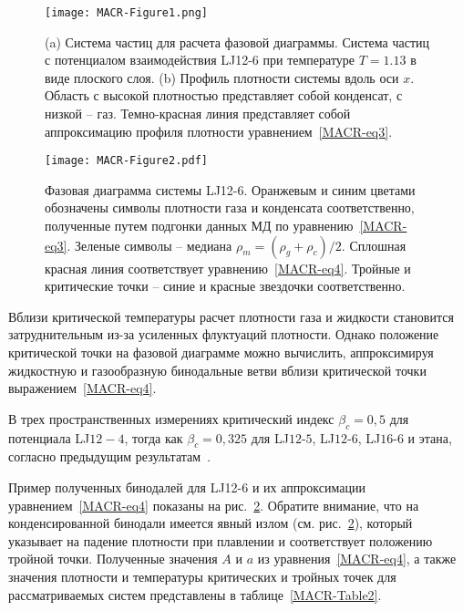 \begin{figure}[!t]
\centering
    \texttt{[image: MACR-Figure1.png]}
    \caption{(a) Система частиц для расчета фазовой диаграммы.
    Система частиц с потенциалом взаимодействия LJ12-6 при температуре $T=1.13$ в виде плоского слоя.
    (b) Профиль плотности системы вдоль оси $x$.
    Область с высокой плотностью представляет собой конденсат, с низкой -- газ.
    Темно-красная линия представляет собой аппроксимацию профиля плотности уравнением~\eqref{MACR-eq3}.}
\label{MACR-Figure1}
\end{figure}


\begin{figure}[!t]
\centering
    \texttt{[image: MACR-Figure2.pdf]}
    \caption{Фазовая диаграмма системы LJ12-6.
    Оранжевым и синим цветами обозначены символы плотности газа и конденсата соответственно, полученные путем подгонки данных МД по уравнению~\eqref{MACR-eq3}.
    Зеленые символы -- медиана $\rho_m=(\rho_g+\rho_c)/2$.
    Сплошная красная линия соответствует уравнению~\eqref{MACR-eq4}.
    Тройные и критические точки -- синие и красные звездочки соответственно.
    }
\label{MACR-Figure2}
\end{figure}

Вблизи критической температуры расчет плотности газа и жидкости становится затруднительным из-за усиленных флуктуаций плотности.
Однако положение критической точки на фазовой диаграмме можно вычислить, аппроксимируя жидкостную и газообразную бинодальные ветви вблизи критической точки выражением~\ref{MACR-eq4}.

В трех пространственных измерениях критический индекс $\beta_c = 0,5$ для потенциала LJ$12-4$, тогда как $\beta_c = 0,325$ для LJ$12$-$5$, LJ$12$-$6$, LJ$16$-$6$ и этана, согласно предыдущим результатам~\cite{10.1021/acs.jced.6b01036,10.1021/jp9072137,10.1103/physrevlett.89.025703}.

Пример полученных бинодалей для LJ12-6 и их аппроксимации уравнением~\eqref{MACR-eq4} показаны на рис.~\ref{MACR-Figure2}.
Обратите внимание, что на конденсированной бинодали имеется явный излом (см. рис.~\ref{MACR-Figure2}), который указывает на падение плотности при плавлении и соответствует положению тройной точки.
Полученные значения $A$ и $a$ из уравнения~\eqref{MACR-eq4}, а также значения плотности и температуры критических и тройных точек для рассматриваемых систем представлены в таблице~\ref{MACR-Table2}.

